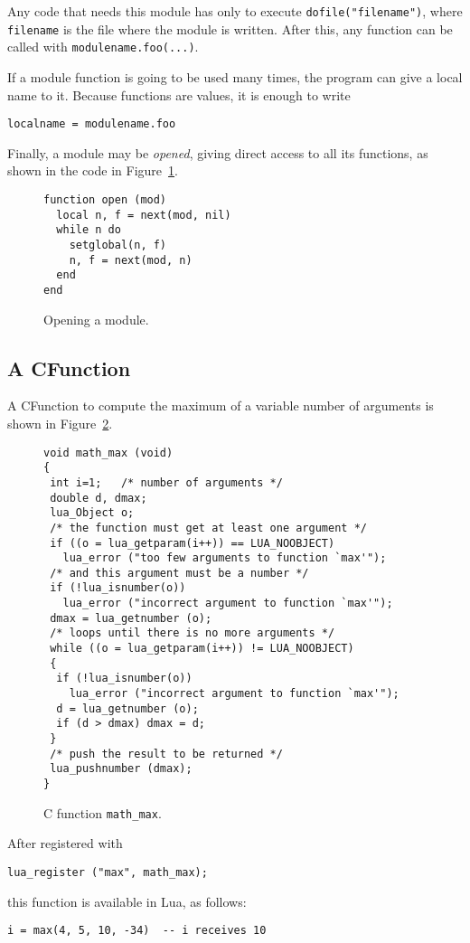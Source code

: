 Any code that needs this module has only to execute
\verb'dofile("filename")', where \verb'filename' is the file
where the module is written.
After this, any function can be called with \verb'modulename.foo(...)'.

If a module function is going to be used many times,
the program can give a local name to it.
Because functions are values, it is enough to write
\begin{verbatim}
localname = modulename.foo
\end{verbatim}
Finally, a module may be {\em opened},
giving direct access to all its functions,
as shown in the code in Figure~\ref{openmod}.
\begin{figure}
\Line
\begin{verbatim}
function open (mod)
  local n, f = next(mod, nil)
  while n do
    setglobal(n, f)
    n, f = next(mod, n)
  end
end
\end{verbatim}
\caption{Opening a module.\label{openmod}}
\Line
\end{figure}

\subsection{A CFunction} \label{exCFunction}
A CFunction to compute the maximum of a variable number of arguments
is shown in Figure~\ref{Cmax}.
\begin{figure}
\Line
\begin{verbatim}
void math_max (void)
{
 int i=1;   /* number of arguments */
 double d, dmax;
 lua_Object o;
 /* the function must get at least one argument */
 if ((o = lua_getparam(i++)) == LUA_NOOBJECT)
   lua_error ("too few arguments to function `max'");
 /* and this argument must be a number */
 if (!lua_isnumber(o))
   lua_error ("incorrect argument to function `max'");
 dmax = lua_getnumber (o);
 /* loops until there is no more arguments */
 while ((o = lua_getparam(i++)) != LUA_NOOBJECT)
 {
  if (!lua_isnumber(o))
    lua_error ("incorrect argument to function `max'");
  d = lua_getnumber (o);
  if (d > dmax) dmax = d;
 }
 /* push the result to be returned */
 lua_pushnumber (dmax);
}
\end{verbatim}
\caption{C function {\tt math\_max}.\label{Cmax}}
\Line
\end{figure}
After registered with
\begin{verbatim}
lua_register ("max", math_max);
\end{verbatim}
this function is available in Lua, as follows:
\begin{verbatim}
i = max(4, 5, 10, -34)  -- i receives 10
\end{verbatim}


